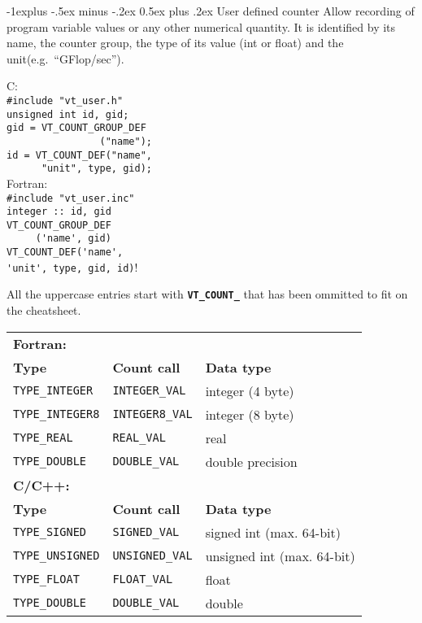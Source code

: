 \documentclass[a4paper,10pt,landscape]{article}
\makeatletter
\renewcommand{\subsection}{\@startsection{subsection}{2}{0mm}%
                                {-1explus -.5ex minus -.2ex}%
                                {0.5ex plus .2ex}%
                                {\normalfont\normalsize\bfseries}}
\makeatother
\begin{document}
\begin{multicols}{3}
\subsection{User defined counter}
Allow recording of program variable values or any other numerical quantity.
It is identified by its name, the counter group, the type of its value (int or float) and the unit(e.g.~``GFlop/sec'').
\begin{multicols}{2}
C:\\
\verb!#include "vt_user.h"!\\
\verb!unsigned int id, gid;!\\
\verb!gid = VT_COUNT_GROUP_DEF!\\
\verb!                ("name");!\\
\verb!id = VT_COUNT_DEF("name",!\\
\verb!      "unit", type, gid);!\\

Fortran:\\
\verb!#include "vt_user.inc"!\\
\verb!integer :: id, gid!\\
\verb!VT_COUNT_GROUP_DEF!\\
\verb!     ('name', gid)!\\
\verb!VT_COUNT_DEF('name',!\\
\verb!'unit', type, gid, id)!!\\
\end{multicols}

All the uppercase entries start with \texttt{\textbf{VT\_COUNT\_}} that has been ommitted to fit on the cheatsheet.
\begin{tabular}{@{}l@{ }l@{ }l@{}}
\textbf{Fortran:} \\
\textbf{Type} & \textbf{Count call} & \textbf{Data type} \\ 
\texttt{TYPE\_INTEGER} &
	\texttt{INTEGER\_VAL} &
	integer (4 byte) \\
\texttt{TYPE\_INTEGER8} &
	\texttt{INTEGER8\_VAL} &
	integer (8 byte) \\
\texttt{TYPE\_REAL} &
	\texttt{REAL\_VAL} &
	real \\
\texttt{TYPE\_DOUBLE} &
	\texttt{DOUBLE\_VAL} &
	double precision \\

\textbf{C/C++:} \\
\textbf{Type} & \textbf{Count call} & \textbf{Data type} \\ 
\texttt{TYPE\_SIGNED} &
	\texttt{SIGNED\_VAL} &
	signed int (max. 64-bit) \\
\texttt{TYPE\_UNSIGNED} &
	\texttt{UNSIGNED\_VAL} &
	unsigned int (max. 64-bit) \\
\texttt{TYPE\_FLOAT} &
	\texttt{FLOAT\_VAL} &
	float \\
\texttt{TYPE\_DOUBLE} &
	\texttt{DOUBLE\_VAL} &
	double \\
\end{tabular}


\end{multicols}
\end{document}
